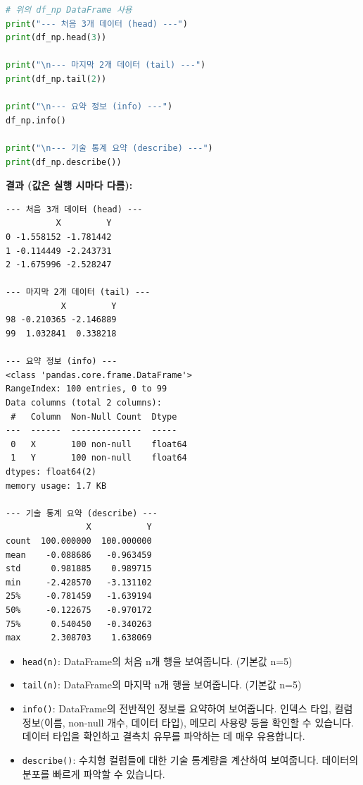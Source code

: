 \documentclass[11pt,a4paper]{book}
\theoremstyle{definition}
\begin{document}
\begin{codeexamplebox}
\begin{lstlisting}[language=Python, caption={DataFrame 기본 메서드 사용}, label={lst:df_methods}, breaklines=true]
# 위의 df_np DataFrame 사용
print("--- 처음 3개 데이터 (head) ---")
print(df_np.head(3))

print("\n--- 마지막 2개 데이터 (tail) ---")
print(df_np.tail(2))

print("\n--- 요약 정보 (info) ---")
df_np.info()

print("\n--- 기술 통계 요약 (describe) ---")
print(df_np.describe())
\end{lstlisting}
\textbf{결과 (값은 실행 시마다 다름):}
\begin{verbatim}
--- 처음 3개 데이터 (head) ---
          X         Y
0 -1.558152 -1.781442
1 -0.114449 -2.243731
2 -1.675996 -2.528247

--- 마지막 2개 데이터 (tail) ---
           X         Y
98 -0.210365 -2.146889
99  1.032841  0.338218

--- 요약 정보 (info) ---
<class 'pandas.core.frame.DataFrame'>
RangeIndex: 100 entries, 0 to 99
Data columns (total 2 columns):
 #   Column  Non-Null Count  Dtype
---  ------  --------------  -----
 0   X       100 non-null    float64
 1   Y       100 non-null    float64
dtypes: float64(2)
memory usage: 1.7 KB

--- 기술 통계 요약 (describe) ---
                X           Y
count  100.000000  100.000000
mean    -0.088686   -0.963459
std      0.981885    0.989715
min     -2.428570   -3.131102
25%     -0.781459   -1.639194
50%     -0.122675   -0.970172
75%      0.540450   -0.340263
max      2.308703    1.638069
\end{verbatim}
\end{codeexamplebox}
\begin{itemize}
    \item \texttt{head(n)}: DataFrame의 처음 n개 행을 보여줍니다. (기본값 n=5)
    \item \texttt{tail(n)}: DataFrame의 마지막 n개 행을 보여줍니다. (기본값 n=5)
    \item \texttt{info()}: DataFrame의 전반적인 정보를 요약하여 보여줍니다. 인덱스 타입, 컬럼 정보(이름, non-null 개수, 데이터 타입), 메모리 사용량 등을 확인할 수 있습니다. 데이터 타입을 확인하고 결측치 유무를 파악하는 데 매우 유용합니다.
    \item \texttt{describe()}: 수치형 컬럼들에 대한 기술 통계량을 계산하여 보여줍니다. 데이터의 분포를 빠르게 파악할 수 있습니다.
\end{itemize}
\end{document}
